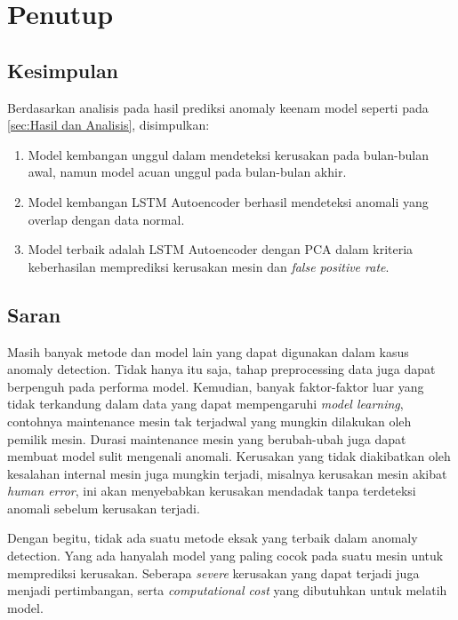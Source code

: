 \chapter{Penutup}

\section{Kesimpulan}
Berdasarkan analisis pada hasil prediksi anomaly keenam model seperti pada \ref{sec:Hasil dan Analisis}, disimpulkan:
\begin{enumerate}
    \item Model kembangan unggul dalam mendeteksi kerusakan pada bulan-bulan awal, namun model acuan unggul pada bulan-bulan akhir.
    \item Model kembangan LSTM Autoencoder berhasil mendeteksi anomali yang overlap dengan data normal.
    \item Model terbaik adalah LSTM Autoencoder dengan PCA dalam kriteria keberhasilan memprediksi kerusakan mesin dan \emph{false positive rate}.
\end{enumerate}

\section{Saran}

Masih banyak metode dan model lain yang dapat digunakan dalam kasus anomaly detection. Tidak hanya itu saja, tahap preprocessing data juga dapat berpenguh pada performa model. Kemudian, banyak faktor-faktor luar yang tidak terkandung dalam data yang dapat mempengaruhi \emph{model learning}, contohnya maintenance mesin tak terjadwal yang mungkin dilakukan oleh pemilik mesin. Durasi maintenance mesin yang berubah-ubah juga dapat membuat model sulit mengenali anomali. Kerusakan yang tidak diakibatkan oleh kesalahan internal mesin juga mungkin terjadi, misalnya kerusakan mesin akibat \emph{human error}, ini akan menyebabkan kerusakan mendadak tanpa terdeteksi anomali sebelum kerusakan terjadi.

Dengan begitu, tidak ada suatu metode eksak yang terbaik dalam anomaly detection. Yang ada hanyalah model yang paling cocok pada suatu mesin untuk memprediksi kerusakan. Seberapa \emph{severe} kerusakan yang dapat terjadi juga menjadi pertimbangan, serta \emph{computational cost} yang dibutuhkan untuk melatih model.